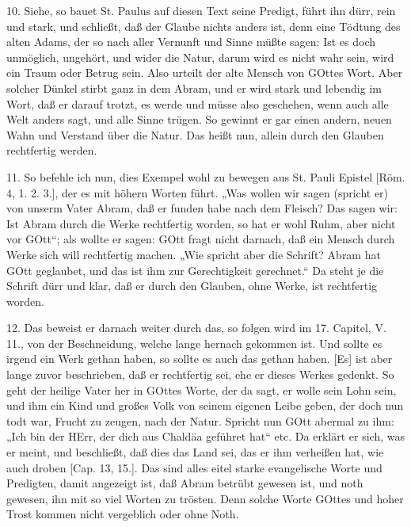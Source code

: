 10. Siehe, so bauet St. Paulus auf diesen Text seine Predigt, führt ihn dürr, rein und stark, und schließt, daß der Glaube nichts anders ist, denn eine Tödtung des alten Adams, der so nach aller Vernunft und Sinne müßte sagen: Ist es doch unmöglich, ungehört, und wider die Natur, darum wird es nicht wahr sein, wird ein Traum oder Betrug sein. Also urteilt der alte Mensch von GOttes Wort. Aber solcher Dünkel stirbt ganz in dem Abram, und er wird stark und lebendig im Wort, daß er darauf trotzt, es werde und müsse also geschehen, wenn auch alle Welt anders sagt, und alle Sinne trügen. So gewinnt er gar einen andern, neuen Wahn und Verstand über die Natur. Das heißt nun, allein durch den Glauben rechtfertig werden.

11. So befehle ich nun, dies Exempel wohl zu bewegen aus St. Pauli Epistel [Röm. 4, 1. 2. 3.], der es mit höhern Worten führt. „Was wollen wir sagen (spricht er) von unserm Vater Abram, daß er funden habe nach dem Fleisch? Das sagen wir: Ist Abram durch die Werke rechtfertig worden, so hat er wohl Ruhm, aber nicht vor GOtt“; als wollte er sagen: GOtt fragt nicht darnach, daß ein Mensch durch Werke sich will rechtfertig machen. „Wie spricht aber die Schrift? Abram hat GOtt geglaubet, und das ist ihm zur Gerechtigkeit gerechnet.“ Da steht je die Schrift dürr und klar, daß er durch den Glauben, ohne Werke, ist rechtfertig worden.

12. Das beweist er darnach weiter durch das, so folgen wird im 17. Capitel, V. 11., von der Beschneidung, welche lange hernach gekommen ist. Und sollte es irgend ein Werk gethan haben, so sollte es auch das gethan haben. [Es] ist aber lange zuvor beschrieben, daß er rechtfertig sei, ehe er dieses Werkes gedenkt. So geht der heilige Vater her in GOttes Worte, der da sagt, er wolle sein Lohn sein, und ihm ein Kind und großes Volk von seinem eigenen Leibe geben, der doch nun todt war, Frucht zu zeugen, nach der Natur. Spricht nun GOtt abermal zu ihm: „Ich bin der HErr, der dich aus Chaldäa geführet hat“ etc. Da erklärt er sich, was er meint, und beschließt, daß dies das Land sei, das er ihm
verheißen hat, wie auch droben [Cap. 13, 15.]. Das sind alles eitel starke evangelische Worte und Predigten, damit angezeigt ist, daß Abram betrübt gewesen ist, und noth gewesen, ihn mit so viel Worten zu trösten. Denn solche Worte GOttes und hoher Trost kommen nicht vergeblich oder ohne Noth.

